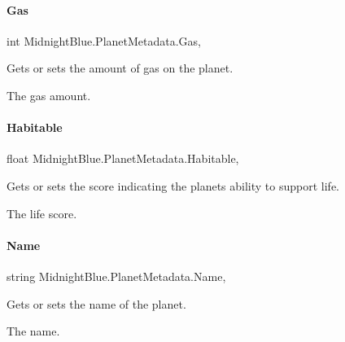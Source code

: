 \paragraph{\texorpdfstring{Gas}{Gas}}
{\footnotesize\ttfamily int Midnight\+Blue.\+Planet\+Metadata.\+Gas\hspace{0.3cm}{\ttfamily [get]}, {\ttfamily [set]}}



Gets or sets the amount of gas on the planet. 

The gas amount.\hypertarget{class_midnight_blue_1_1_planet_metadata_a918efa02de6f3aae58d4cc3804d149eb}{}\label{class_midnight_blue_1_1_planet_metadata_a918efa02de6f3aae58d4cc3804d149eb} 
\paragraph{\texorpdfstring{Habitable}{Habitable}}
{\footnotesize\ttfamily float Midnight\+Blue.\+Planet\+Metadata.\+Habitable\hspace{0.3cm}{\ttfamily [get]}, {\ttfamily [set]}}



Gets or sets the score indicating the planets ability to support life. 

The life score.\hypertarget{class_midnight_blue_1_1_planet_metadata_a7afda7361d57bbbf9bb9d6be47167149}{}\label{class_midnight_blue_1_1_planet_metadata_a7afda7361d57bbbf9bb9d6be47167149} 
\paragraph{\texorpdfstring{Name}{Name}}
{\footnotesize\ttfamily string Midnight\+Blue.\+Planet\+Metadata.\+Name\hspace{0.3cm}{\ttfamily [get]}, {\ttfamily [set]}}



Gets or sets the name of the planet. 

The name.\hypertarget{class_midnight_blue_1_1_planet_metadata_a2aa80bee630ca09d10ab12c7734e1ea4}{}\label{class_midnight_blue_1_1_planet_metadata_a2aa80bee630ca09d10ab12c7734e1ea4} 
